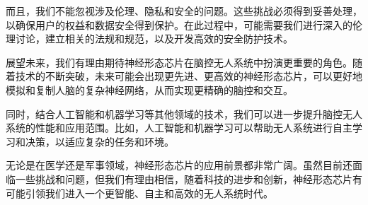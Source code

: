 \documentclass{thuemp}
\begin{document}
而且，我们不能忽视涉及伦理、隐私和安全的问题。这些挑战必须得到妥善处理，以确保用户的权益和数据安全得到保护。在此过程中，可能需要我们进行深入的伦理讨论，建立相关的法规和规范，以及开发高效的安全防护技术。

展望未来，我们有理由期待神经形态芯片在脑控无人系统中扮演更重要的角色。随着技术的不断突破，未来可能会出现更先进、更高效的神经形态芯片，可以更好地模拟和复制人脑的复杂神经网络，从而实现更精确的脑控和交互。

同时，结合人工智能和机器学习等其他领域的技术，我们可以进一步提升脑控无人系统的性能和应用范围。比如，人工智能和机器学习可以帮助无人系统进行自主学习和决策，以适应复杂的任务和环境。

无论是在医学还是军事领域，神经形态芯片的应用前景都非常广阔。虽然目前还面临一些挑战和问题，但我们有理由相信，随着科技的进步和创新，神经形态芯片有可能引领我们进入一个更智能、自主和高效的无人系统时代。
\cite{崔翯2023脑机接口概论}




\renewcommand\refname{\heiti\wuhao\centerline{参考文献}\global\def\refname{参考文献}}
\vskip 12pt

\let\OLDthebibliography\thebibliography
\renewcommand\thebibliography[1]{
  \OLDthebibliography{#1}
  \setlength{\parskip}{0pt}
  \setlength{\itemsep}{0pt plus 0.3ex}
}

{
\renewcommand{\baselinestretch}{0.9}
\liuhao
\nocite{*}


}
\end{document}
